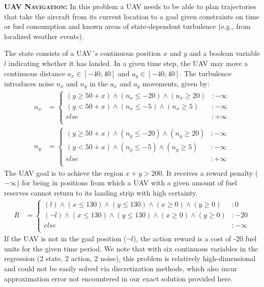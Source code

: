 {\bf \textsc{UAV Navigation}:}
In this problem a UAV needs to be able to plan trajectories that take
the aircraft from its current location to a goal given constraints on
time or fuel consumption and known areas of state-dependent turbulence
(e.g., from localized weather events).

The state consists of a UAV´s continuous position $x$ and $y$ and a
boolean variable $l$ indicating whether it has landed.  In a given
time step, the UAV may move a continuous distance $a_x \in [-40,40]$
and $a_y \in [-40,40]$. The turbulence introduces noise $n_x$ and
$n_y$ in the $a_x$ and $a_y$ movements, given by: {\footnotesize
\begin{align*}
n_x & = \begin{cases}
(y \geq 50 + x) \wedge (n_x \leq -20) \wedge (n_x \geq 20) &:-\infty\\
(y < 50 + x) \wedge (n_x \leq -5) \wedge (n_x \geq 5) &:-\infty\\
else &: +\infty\\
\end{cases}\\
n_y & = \begin{cases}
(y \geq 50 + x) \wedge (n_y \leq -20) \wedge (n_y \geq 20) &:-\infty\\
(y < 50 + x) \wedge (n_y \leq -5) \wedge (n_y \geq 5) &:-\infty\\
else &: +\infty\\
\end{cases}
\end{align*}}
The UAV goal is to achieve the region $x+y > 200$. It receives a
reward penalty ($-\infty$) for being in positions from which a UAV
with a given amount of fuel reserves cannot return to its landing
strip with high certainty. 
{\footnotesize
\begin{align*}
R & = \begin{cases}
(l) \wedge (x \leq 130) \wedge (y \leq 130) \wedge (x \geq 0) \wedge (y \geq 0) & \!\! :0\\
(\neg l) \wedge (x \leq 130) \wedge (y \leq 130) \wedge (x \geq 0) \wedge (y \geq 0) & \!\! :-20\\
else &: -\infty\\
\end{cases}
\end{align*}}
If the UAV is not in the goal position ($\neg l$), the action
reward is a cost of -20 fuel units for the given time period.  We note that
with six continuous variables in the regression (2 state, 2 action, 2 noise),
this problem is relatively high-dimensional and could not be easily solved
via discretization methods, which also incur approximation error not encountered
in our exact solution provided here.

